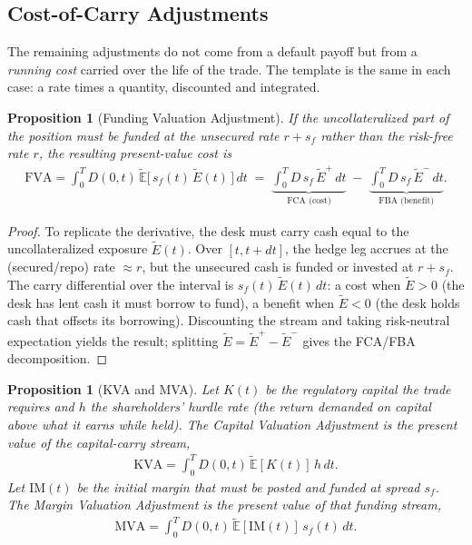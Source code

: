 \documentclass{report}
\theoremstyle{spacedplain}
\newtheorem{proposition}[theorem]{Proposition}
\theoremstyle{spaceddefinition}
\theoremstyle{spacedremark}
\begin{document}
\subsection{Cost-of-Carry Adjustments}

The remaining adjustments do not come from a default payoff but from a \emph{running cost} carried over the life of the trade. The template is the same in each case: a rate times a quantity, discounted and integrated.

\begin{proposition}[Funding Valuation Adjustment]\label{prop:fva}
If the uncollateralized part of the position must be funded at the unsecured rate $r+s_f$ rather than the risk-free rate $r$, the resulting present-value cost is
\begin{align}
    \text{FVA} = \int_0^T D(0,t)\,\widetilde{\mathbb{E}}\big[\,s_f(t)\,\widetilde{E}(t)\,\big]\,dt
    \;=\;\underbrace{\int_0^T D\,s_f\,\widetilde{E}^+\,dt}_{\text{FCA (cost)}}\;-\;\underbrace{\int_0^T D\,s_f\,\widetilde{E}^-\,dt}_{\text{FBA (benefit)}}.
\end{align}
\end{proposition}

\begin{proof}
To replicate the derivative, the desk must carry cash equal to the uncollateralized exposure $\widetilde{E}(t)$. Over $[t,t+dt]$, the hedge leg accrues at the (secured/repo) rate $\approx r$, but the unsecured cash is funded or invested at $r+s_f$. The carry differential over the interval is $s_f(t)\,\widetilde{E}(t)\,dt$: a cost when $\widetilde{E}>0$ (the desk has lent cash it must borrow to fund), a benefit when $\widetilde{E}<0$ (the desk holds cash that offsets its borrowing). Discounting the stream and taking risk-neutral expectation yields the result; splitting $\widetilde{E}=\widetilde{E}^+-\widetilde{E}^-$ gives the FCA/FBA decomposition.
\end{proof}


\begin{proposition}[KVA and MVA]
Let $K(t)$ be the regulatory capital the trade requires and $h$ the shareholders' hurdle rate (the return demanded on capital above what it earns while held). The Capital Valuation Adjustment is the present value of the capital-carry stream,
\begin{align}
    \text{KVA} = \int_0^T D(0,t)\,\widetilde{\mathbb{E}}[K(t)]\,h\,dt.
\end{align}
Let $\text{IM}(t)$ be the initial margin that must be posted and funded at spread $s_f$. The Margin Valuation Adjustment is the present value of that funding stream,
\begin{align}
    \text{MVA} = \int_0^T D(0,t)\,\widetilde{\mathbb{E}}[\text{IM}(t)]\,s_f(t)\,dt.
\end{align}
\end{proposition}
\end{document}
